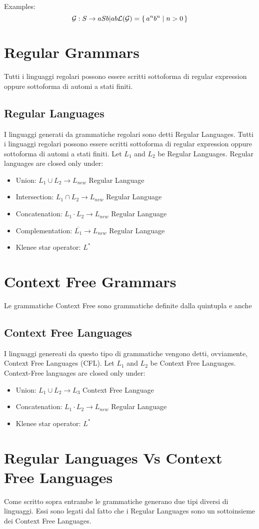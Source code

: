Examples:
\[
\mathcal{G}: S \rightarrow aSb | ab

\mathcal{L(G)} = \set{ a^nb^n | n > 0 } 
\]

\section{Regular Grammars}
Tutti i linguaggi regolari possono essere scritti sottoforma di regular expression oppure sottoforma di automi a stati finiti.

\subsection{Regular Languages}
I linguaggi generati da grammatiche regolari sono detti Regular Languages.
Tutti i linguaggi regolari possono essere scritti sottoforma di regular expression oppure sottoforma di automi a stati finiti.
Let $L_1$ and $L_2$ be Regular Languages.
Regular languages are closed only under:
\begin{itemize}
\item Union: $L_1 \cup L_2 \rightarrow L_{new}$ Regular Language
\item Intersection: $L_1 \cap L_2 \rightarrow L_{new}$ Regular Language
\item Concatenation: $L_1 \cdot L_2 \rightarrow L_{new}$ Regular Language
\item Complementation: $\bar{L_1} \rightarrow L_{new}$ Regular Language
\item Klenee star operator: $L^*$
\end{itemize}
\section{Context Free Grammars}
Le grammatiche Context Free sono grammatiche definite dalla quintupla \newline e anche

\subsection{Context Free Languages}
I linguaggi genereati da questo tipo di grammatiche vengono detti, ovviamente, Context Free Languages (CFL).
Let $L_1$ and $L_2$ be Context Free Languages.
Context-Free languages are closed only under:
\begin{itemize}
\item Union: $L_1 \cup L_2 \rightarrow L_3$ Context Free Language
\item Concatenation: $L_1 \cdot L_2 \rightarrow L_{new}$ Regular Language
\item Klenee star operator: $L^*$
\end{itemize}

\section{Regular Languages Vs Context Free Languages}

Come scritto sopra entrambe le grammatiche generano due tipi diversi di linguaggi. Essi sono legati dal fatto che i Regular Languages sono un sottoinsieme dei Context Free Languages.